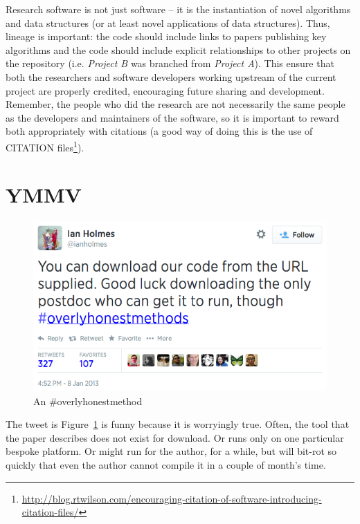 \documentclass[conference]{IEEEtran}
\begin{document}
Research software is not just software -- it is the instantiation of
novel algorithms and data structures (or at least novel applications
of data structures). Thus, lineage is important: the code should
include links to papers publishing key algorithms and the
code should include explicit relationships to other projects on the
repository (i.e. {\emph{Project B}} was branched from {\emph{Project
A}}). This ensure that both the researchers and software developers
working upstream of the current project are properly credited,
encouraging future sharing and development. Remember, the people who
did the research are not necessarily the same people as the developers
and maintainers of the software, so it is important to reward both
appropriately with citations (a good way of doing this is the use of
CITATION
files\footnote{\url{http://blog.rtwilson.com/encouraging-citation-of-software-introducing-citation-files/}}).


\section{YMMV}

\begin{figure}[!ht]
\centering
\includegraphics[width=\columnwidth]{overlyhonesttweet.png}
\caption{An \#overlyhonestmethod}
\label{fig:overlyhonestmethod} 
\end{figure}

The tweet is Figure~\ref{fig:overlyhonestmethod} is funny because it
is worryingly true. Often, the tool that the paper describes does not
exist for download. Or runs only on one particular bespoke
platform. Or might run for the author, for a while, but will bit-rot
so quickly that even the author cannot compile it in a couple of
month's time.
\end{document}
